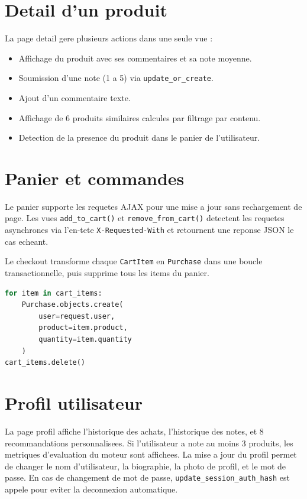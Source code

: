 \documentclass[12pt,a4paper]{report}
\newcommand{\fonction}[1]{\texttt{#1()}}
\newcommand{\classe}[1]{\texttt{#1}}
\begin{document}
\section{Detail d'un produit}

La page detail gere plusieurs actions dans une seule vue :

\begin{itemize}
  \item Affichage du produit avec ses commentaires et sa note moyenne.
  \item Soumission d'une note (1 a 5) via \texttt{update\_or\_create}.
  \item Ajout d'un commentaire texte.
  \item Affichage de 6 produits similaires calcules par filtrage par contenu.
  \item Detection de la presence du produit dans le panier de l'utilisateur.
\end{itemize}

\section{Panier et commandes}

Le panier supporte les requetes AJAX pour une mise a jour sans rechargement de
page. Les vues \fonction{add\_to\_cart} et \fonction{remove\_from\_cart}
detectent les requetes asynchrones via l'en-tete \texttt{X-Requested-With} et
retournent une reponse JSON le cas echeant.

Le checkout transforme chaque \classe{CartItem} en \classe{Purchase} dans une
boucle transactionnelle, puis supprime tous les items du panier.

\begin{lstlisting}[language=Python,caption={Logique du checkout}]
for item in cart_items:
    Purchase.objects.create(
        user=request.user,
        product=item.product,
        quantity=item.quantity
    )
cart_items.delete()
\end{lstlisting}

\section{Profil utilisateur}

La page profil affiche l'historique des achats, l'historique des notes, et
8 recommandations personnalisees. Si l'utilisateur a note au moins 3 produits,
les metriques d'evaluation du moteur sont affichees. La mise a jour du profil
permet de changer le nom d'utilisateur, la biographie, la photo de profil, et
le mot de passe. En cas de changement de mot de passe, \texttt{update\_session\_auth\_hash}
est appele pour eviter la deconnexion automatique.
\end{document}

